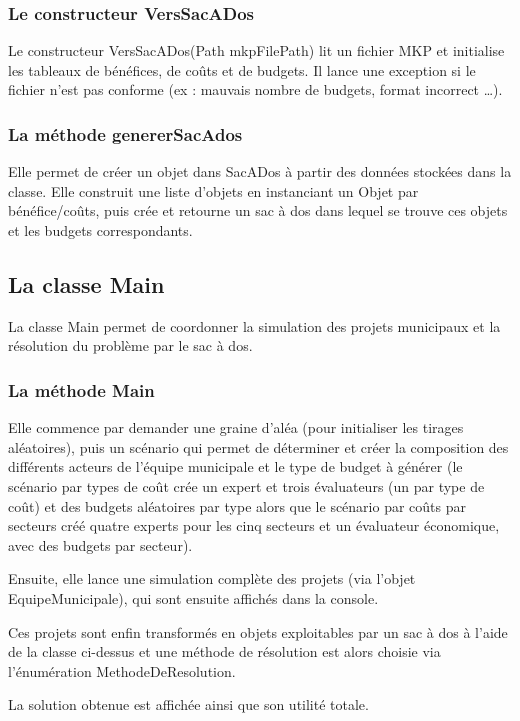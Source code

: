 \documentclass[11pt]{article}
\begin{document}
\subsubsection{Le constructeur VersSacADos}
Le constructeur VersSacADos(Path mkpFilePath) lit un fichier MKP et initialise les tableaux de bénéfices, de coûts et de budgets. Il lance une exception si le fichier n’est pas conforme (ex : mauvais nombre de budgets, format incorrect …).

\subsubsection{La méthode genererSacAdos}
Elle permet de créer un objet dans SacADos à partir des données stockées dans la classe. Elle construit une liste d’objets en instanciant un Objet par bénéfice/coûts, puis crée et retourne un sac à dos dans lequel se trouve ces objets et les budgets correspondants.


\subsection{La classe Main}
La classe Main permet de coordonner la simulation des projets municipaux et la résolution du problème par le sac à dos.

\subsubsection{La méthode Main}

Elle commence par demander une graine d’aléa (pour initialiser les tirages aléatoires), puis un scénario qui permet de déterminer et créer la composition des différents acteurs de l'équipe municipale et le type de budget à générer (le scénario par types de coût crée un expert et trois évaluateurs (un par type de coût) et des budgets aléatoires par type alors que le scénario par coûts par secteurs créé quatre experts pour les cinq secteurs et un évaluateur économique, avec des budgets par secteur).

Ensuite, elle lance une simulation complète des projets (via l’objet EquipeMunicipale), qui sont ensuite affichés dans la console. 

Ces projets sont enfin transformés en objets exploitables par un sac à dos à l’aide de la classe ci-dessus et une méthode de résolution est alors choisie via l'énumération MethodeDeResolution.

La solution obtenue est affichée ainsi que son utilité totale.
\end{document}
